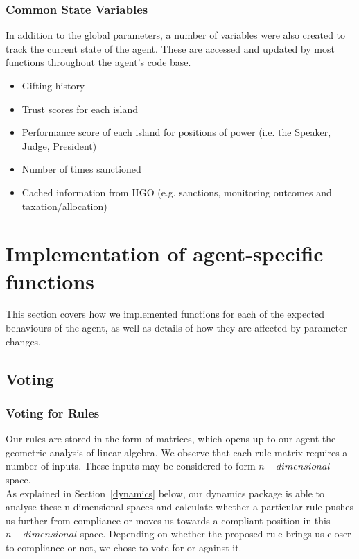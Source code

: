 \documentclass{article}
\begin{document}
\subsubsection{Common State Variables}
In addition to the global parameters, a number of variables were also created to track the current state of the agent. These are accessed and updated by most functions throughout the agent's code base. 
\begin{itemize}
\item Gifting history
\item Trust scores for each island 
\item Performance score of each island for positions of power (i.e. the Speaker, Judge, President)
\item Number of times sanctioned
\item Cached information from IIGO (e.g. sanctions, monitoring outcomes and taxation/allocation)
\end{itemize}

\section{Implementation of agent-specific functions}
\label{section_func_team3}

This section covers how we implemented functions for each of the expected behaviours of the agent, as well as details of how they are affected by parameter changes.

\subsection{Voting}

\subsubsection{Voting for Rules}
Our rules are stored in the form of matrices, which opens up to our agent the geometric analysis of linear algebra. We observe that each rule matrix requires a number of inputs. These inputs may be considered to form $n-dimensional$ space. \\
As explained in Section~\ref{dynamics} below, our dynamics package is able to analyse these n-dimensional spaces and calculate whether a particular rule pushes us further from compliance or moves us towards a compliant position in this $n-dimensional$ space. Depending on whether the proposed rule brings us closer to compliance or not, we chose to vote for or against it.
\end{document}
